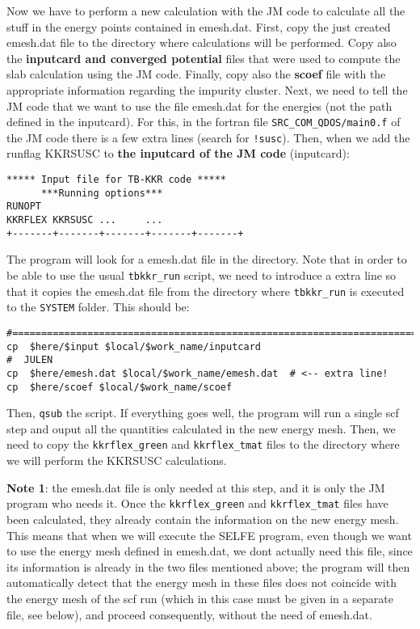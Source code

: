 \documentclass[11pt,fleqn]{book} %
\begin{document}
\begin{itemize}
Now we have to perform a new calculation with the JM code to calculate
all the stuff in the energy points contained in emesh.dat.
First, copy the just created emesh.dat file to the directory where calculations will
be performed. Copy also the \textbf{inputcard and converged potential} files
that were used to compute the slab calculation using the JM code.
Finally, copy also the \textbf{scoef} file with the appropriate
information regarding the impurity cluster.
Next, we need to tell the JM code that we want to use the file emesh.dat for
the energies (not the path defined in the inputcard).
For this, in the fortran file \verb|SRC_COM_QDOS/main0.f| of the JM code
there is a few extra lines (search for \verb|!susc|).
Then, when we add the runflag KKRSUSC to \textbf{the inputcard of the JM code}
(inputcard):
\begin{VBox}
\begin{verbatim}
***** Input file for TB-KKR code *****
      ***Running options***
RUNOPT
KKRFLEX KKRSUSC ...     ...
+-------+-------+-------+-------+-------+
\end{verbatim}
\end{VBox}
The program will look for a emesh.dat file in the directory.
Note that in order to be able to use the usual \verb|tbkkr_run|
script, we need to introduce a extra line so that it copies the emesh.dat
file from the directory where \verb|tbkkr_run| is executed to the \verb|SYSTEM|
folder. This should be:
\begin{VBox}
\begin{verbatim}
#=======================================================================
cp  $here/$input $local/$work_name/inputcard
#  JULEN
cp  $here/emesh.dat $local/$work_name/emesh.dat  # <-- extra line!
cp  $here/scoef $local/$work_name/scoef
\end{verbatim}
\end{VBox}
Then, \verb|qsub| the script. If everything goes well,
the program will run a single scf step and ouput all the quantities
calculated in the new energy mesh. Then, we need to copy the
\verb|kkrflex_green| and \verb|kkrflex_tmat| files to the
directory where we will perform the KKRSUSC calculations.

\textbf{Note 1}: the emesh.dat file is only needed at this step, and it is only
the JM program who needs it. Once the \verb|kkrflex_green| and \verb|kkrflex_tmat| files
have been calculated, they already contain the information on the new energy mesh.
This means that when we will execute the SELFE  program, even though we want to
use the energy mesh defined in emesh.dat, we dont actually need this file,
since its information is already in the two files mentioned above; the program
will then automatically detect that the energy mesh in these files does not coincide
with the energy mesh of the scf run (which in this case must be given in a separate
file, see below), and proceed consequently, without the need of emesh.dat.


\end{itemize}
\end{document}
